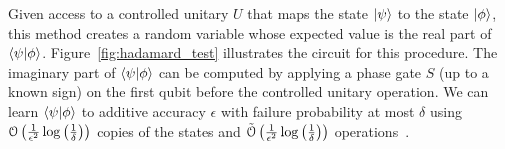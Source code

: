 Given access to a controlled unitary $U$ that maps the state $\ket{\psi}$ to the state $\ket{\phi}$, this method creates a random variable whose expected value is the real part of $\braket{\psi}{\phi}$.
Figure~\ref{fig:hadamard_test} illustrates the circuit for this procedure.
The imaginary part of $\braket{\psi}{\phi}$ can be computed by applying a phase gate $S$ (up to a known sign) on the first qubit before the controlled unitary operation.
We can learn $\braket{\psi}{\phi}$ to additive accuracy $\epsilon$ with failure probability at most $\delta$ using $\mathcal{O} \left(\frac{1}{\epsilon^2} \log \left( \frac{1}{\delta} \right) \right)$ copies of the states and $\tilde{\mathcal{O}} \left(\frac{1}{\epsilon^2} \log \left( \frac{1}{\delta} \right) \right)$ operations~\cite{aharonov2006polynomial,huang2019near}.

